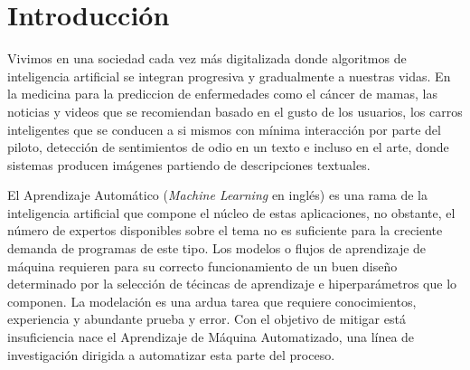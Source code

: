 \chapter*{Introducción}\label{chapter:introduction}
Vivimos en una sociedad cada vez m\'as digitalizada donde algoritmos de inteligencia artificial se integran progresiva y gradualmente a nuestras vidas. En la medicina para la prediccion de enfermedades como el c\'ancer de mamas, las noticias y videos que se recomiendan basado en el gusto de los usuarios, los carros inteligentes que se conducen a si mismos con m\'inima interacci\'on por parte del piloto, detecci\'on de sentimientos de odio en un texto e incluso en el arte, donde sistemas producen im\'agenes partiendo de descripciones textuales.

El Aprendizaje Autom\'atico (\textit{Machine Learning} en ingl\'es) es una rama de la inteligencia artificial que compone el n\'ucleo de estas aplicaciones, no obstante, el n\'umero de expertos disponibles sobre el tema no es suficiente para la creciente demanda de programas de este tipo. Los modelos o flujos de aprendizaje de m\'aquina requieren para su correcto funcionamiento de un buen dise\~no determinado por la selecci\'on de t\'ecincas de aprendizaje e hiperpar\'ametros que lo componen. La modelaci\'on  es una ardua tarea que requiere conocimientos, experiencia y abundante prueba y error. Con el objetivo de mitigar est\'a insuficiencia nace el Aprendizaje de M\'aquina Automatizado, una l\'inea de investigaci\'on dirigida a automatizar esta parte del proceso.

